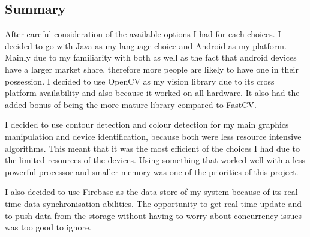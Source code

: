 \subsection{Summary}
After careful consideration of the available options I had for each choices. I decided to go with Java as my language choice and Android as my platform. Mainly due to my familiarity with both as well as the fact that android devices have a larger market share, therefore more people are likely to have one in their possession.  I decided to use OpenCV as my vision library due to its cross platform availability and also because it worked on all hardware. It also had the added bonus of being the more mature library compared to FastCV.

I decided to use contour detection and colour detection for my main graphics manipulation and device identification, because both were less resource intensive algorithms. This meant that it was the most efficient of the choices I had due to the limited resources of the devices. Using something that worked well with a less powerful processor and smaller memory was one of the priorities of this project.

I also decided to use Firebase as the data store of my system because of its real time data synchronisation abilities. The opportunity to get real time update and to push data from the storage without having to worry about concurrency issues was too good to ignore.